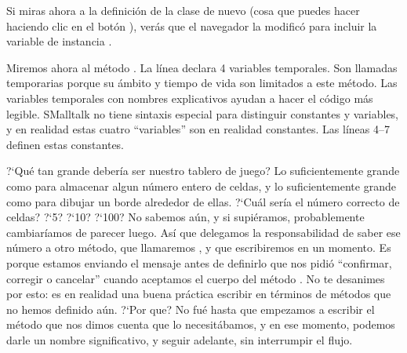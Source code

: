 \documentclass[a4paper,10pt,twoside]{book}
\begin{document}
Si miras ahora a la definici\'on de la clase de nuevo (cosa que puedes hacer haciendo clic en el bot\'on ), ver\'as que el navegador la modific\'o para incluir la variable de instancia .

Miremos ahora al m\'etodo .
La l\'inea  declara 4 variables temporales. Son llamadas temporarias porque su \'ambito y tiempo de vida son limitados a este m\'etodo. Las variables temporales con nombres explicativos ayudan a hacer el c\'odigo m\'as legible. SMalltalk no tiene sintaxis especial para distinguir constantes y variables, y en realidad estas cuatro ``variables'' son en realidad constantes.
Las l\'ineas 4--7 definen estas constantes.

?`Qu\'e tan grande deber\'ia ser nuestro tablero de juego? Lo suficientemente grande como para almacenar algun n\'umero entero de celdas, y lo suficientemente grande como para dibujar un borde alrededor de ellas.
?`Cu\'al ser\'ia el n\'umero correcto de celdas? ?`5? ?`10? ?`100? No sabemos a\'un, y si supi\'eramos, probablemente cambiar\'iamos de parecer luego. As\'i que delegamos la responsabilidad de saber ese n\'umero a otro m\'etodo, que llamaremos , y que escribiremos en un momento.
Es porque estamos enviando el mensaje  antes de definirlo que \pharo nos pidi\'o ``confirmar, corregir o cancelar'' cuando aceptamos el cuerpo del m\'etodo .
No te desanimes por esto: es en realidad una buena pr\'actica escribir en t\'erminos de m\'etodos que no hemos definido a\'un.
?`Por que? No fu\'e hasta que empezamos a escribir el m\'etodo  que nos dimos cuenta que lo necesit\'abamos, y en ese momento, podemos darle un nombre significativo, y seguir adelante, sin interrumpir el flujo.
 
\end{document}
